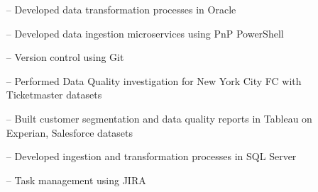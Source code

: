 \documentclass[10pt,a4paper]{altacv}
\begin{document}
\begin{itemize}
    \setlength{\itemindent}{0.5em}
    \item[--]   \small{Developed data transformation processes in Oracle}
    \item[--]   \small{Developed data ingestion microservices using PnP PowerShell}
    \item[--]   \small{Version control using Git}
\end{itemize}

\medskip




\begin{itemize}
    \setlength{\itemindent}{0.5em}
    \item[--]   \small{Performed Data Quality investigation for New York City FC with Ticketmaster datasets}
    \item[--]   \small{Built customer segmentation and data quality reports in Tableau on Experian, Salesforce datasets}
\end{itemize}

\medskip




\begin{itemize}
    \setlength{\itemindent}{0.5em}
    \item[--]   \small{Developed ingestion and transformation processes in SQL Server}
    \item[--]   \small{Task management using JIRA}
\end{itemize}

\medskip


\end{document}
